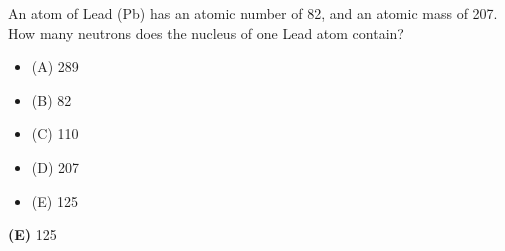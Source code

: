 

An atom of Lead (Pb) has an atomic number of 82, and an atomic mass of 207.  How many neutrons does the nucleus of one Lead atom contain?

\begin{itemize}
\item{(A)} 289
\vskip 5pt 
\item{(B)} 82
\vskip 5pt 
\item{(C)} 110
\vskip 5pt 
\item{(D)} 207
\vskip 5pt 
\item{(E)} 125
\end{itemize}







{\bf (E)} 125
 










